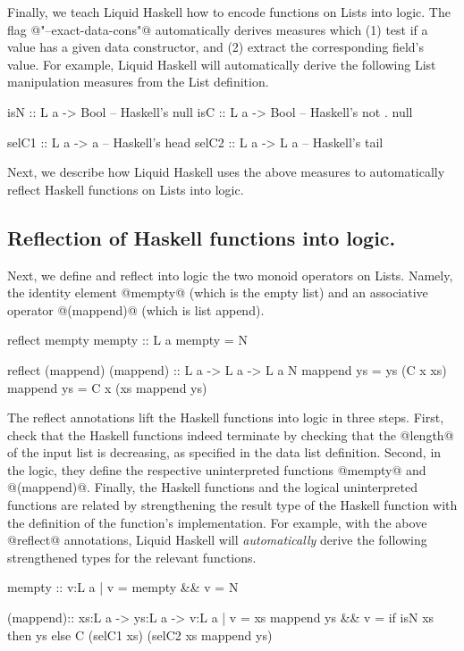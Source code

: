 Finally, we teach Liquid Haskell how to encode functions on Lists
into logic.
%
The flag @"--exact-data-cons"@
automatically derives measures which
(1) test if a value has a given data constructor, and
(2) extract the corresponding field's value.
%
For example, Liquid Haskell will automatically derive the following
List manipulation measures from the List definition.
\begin{code}
isN :: L a -> Bool    -- Haskell's null
isC :: L a -> Bool    -- Haskell's not . null

selC1 :: L a -> a     -- Haskell's head
selC2 :: L a -> L a   -- Haskell's tail
\end{code}
%
Next, we describe how Liquid Haskell uses the above measures
to automatically reflect Haskell functions on Lists into logic.

\subsection{Reflection of Haskell functions into logic.}
Next, we define and reflect into logic the two monoid operators on Lists.
Namely, the identity element @mempty@ (which is the empty list)
and an associative operator @(mappend)@ (which is list append).
%
\begin{code}
reflect mempty
mempty :: L a
mempty = N

reflect (mappend)
(mappend) :: L a -> L a -> L a
N        mappend ys = ys
(C x xs) mappend ys = C x (xs mappend ys)
\end{code}

The reflect annotations lift the Haskell functions into logic in three steps.
%
First, check that the Haskell functions indeed terminate by checking
that the @length@ of the input list is decreasing,
as specified in the data list definition.
%
Second, in the logic, they define the respective uninterpreted functions
@mempty@ and @(mappend)@.
%
Finally, the Haskell functions and the logical uninterpreted functions
are related by strengthening the result type of the Haskell function
with the definition of the function's implementation.
%
For example, with the above @reflect@ annotations,
Liquid Haskell will \textit{automatically} derive the following strengthened
types for the relevant functions.
\begin{code}
mempty  :: {v:L a | v = mempty && v = N }

(mappend):: xs:L a -> ys:L a
    ->  {v:L a | v = xs mappend ys
              && v = if isN xs then ys
                     else C (selC1 xs) (selC2 xs mappend ys)
        }
\end{code}

